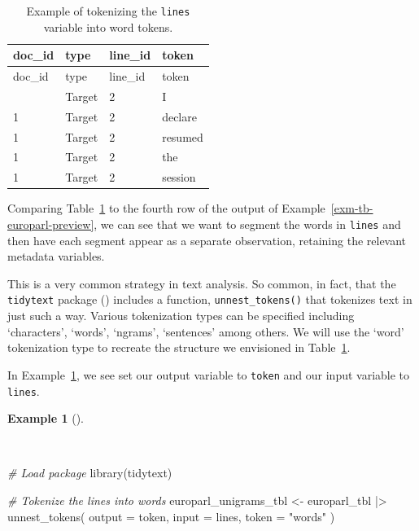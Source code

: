\documentclass[
  letterpaper,
  DIV=11,
  numbers=noendperiod]{scrreprt}
\newenvironment{Shaded}{\begin{snugshade}}{\end{snugshade}}
\newcommand{\AttributeTok}[1]{\textcolor[rgb]{0.00,0.00,0.00}{#1}}
\newcommand{\CommentTok}[1]{\textcolor[rgb]{0.00,0.00,0.00}{\textit{#1}}}
\newcommand{\FunctionTok}[1]{\textcolor[rgb]{0.00,0.00,0.00}{#1}}
\newcommand{\NormalTok}[1]{\textcolor[rgb]{0.00,0.00,0.00}{#1}}
\newcommand{\OtherTok}[1]{\textcolor[rgb]{0.00,0.00,0.00}{#1}}
\newcommand{\SpecialCharTok}[1]{\textcolor[rgb]{0.00,0.00,0.00}{#1}}
\newcommand{\StringTok}[1]{\textcolor[rgb]{0.00,0.00,0.00}{#1}}
\theoremstyle{definition}
\newtheorem{example}{Example}[chapter]
\theoremstyle{remark}
\begin{document}
\begin{longtable}[]{@{}llll@{}}
\caption{Example of tokenizing the \texttt{lines} variable into word
tokens.}\label{tbl-td-europarl-tokenization-words-example}\tabularnewline
\toprule\noalign{}
doc\_id & type & line\_id & token \\
\midrule\noalign{}
\endfirsthead
\toprule\noalign{}
doc\_id & type & line\_id & token \\
\midrule\noalign{}
\endhead
\bottomrule\noalign{}
\endlastfoot
1 & Target & 2 & I \\
1 & Target & 2 & declare \\
1 & Target & 2 & resumed \\
1 & Target & 2 & the \\
1 & Target & 2 & session \\
\end{longtable}

Comparing Table~\ref{tbl-td-europarl-tokenization-words-example} to the
fourth row of the output of Example~\ref{exm-tb-europarl-preview}, we
can see that we want to segment the words in \texttt{lines} and then
have each segment appear as a separate observation, retaining the
relevant metadata variables.

This is a very common strategy in text analysis. So common, in fact,
that the \texttt{tidytext} package () includes a function, \texttt{unnest\_tokens()} that
tokenizes text in just such a way. Various tokenization types can be
specified including `characters', `words', `ngrams', `sentences' among
others. We will use the `word' tokenization type to recreate the
structure we envisioned in
Table~\ref{tbl-td-europarl-tokenization-words-example}.

In Example~\ref{exm-td-europarl-tokenization-words-tidytext}, we see set
our output variable to \texttt{token} and our input variable to
\texttt{lines}.

\begin{example}[]\protect\hypertarget{exm-td-europarl-tokenization-words-tidytext}{}\label{exm-td-europarl-tokenization-words-tidytext}

~

\begin{Shaded}
\begin{Highlighting}[]
\CommentTok{\# Load package}
\FunctionTok{library}\NormalTok{(tidytext)}

\CommentTok{\# Tokenize the lines into words}
\NormalTok{europarl\_unigrams\_tbl }\OtherTok{\textless{}{-}}
\NormalTok{  europarl\_tbl }\SpecialCharTok{|\textgreater{}}
  \FunctionTok{unnest\_tokens}\NormalTok{(}
    \AttributeTok{output =}\NormalTok{ token,}
    \AttributeTok{input =}\NormalTok{ lines,}
    \AttributeTok{token =} \StringTok{"words"}
\NormalTok{  )}
\end{Highlighting}
\end{Shaded}

\end{example}
\end{document}
